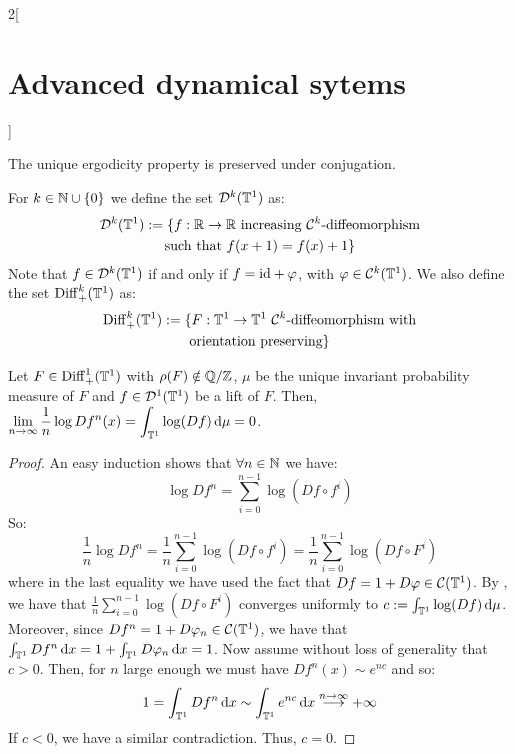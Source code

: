 \documentclass[../../../main_math.tex]{subfiles}
\begin{document}
\begin{multicols}{2}[\section{Advanced dynamical sytems}]
  \begin{remark}
    The unique ergodicity property is preserved under conjugation.
  \end{remark}
  \begin{definition}
    For $k\in\mathbb{N}\cup\{0\}$ we define the set $\mathcal{D}^k(\mathbb{T}^1)$ as:
    \begin{multline*}
      \mathcal{D}^k(\mathbb{T}^1):=\{f:\mathbb{R}\to\mathbb{R} \text{ increasing $\mathcal{C}^k$-diffeomorphism}\\\text{such that }f(x+1)=f(x)+1\}
    \end{multline*}
    Note that $f\in \mathcal{D}^k(\mathbb{T}^1)$ if and only if $f=\mathrm{id} +\varphi$, with $\varphi\in\mathcal{C}^k(\mathbb{T}^1)$.
    We also define the set $\mathrm{Diff}_+^k(\mathbb{T}^1)$ as:
    \begin{multline*}
      \mathrm{Diff}_+^k(\mathbb{T}^1):=\{F:\mathbb{T}^1\to\mathbb{T}^1 \text{ $\mathcal{C}^k$-diffeomorphism with}\\\text{orientation preserving}\}
    \end{multline*}
  \end{definition}
  \begin{proposition}
    Let $F\in\mathrm{Diff}_+^1(\mathbb{T}^1)$ with $\rho(F)\notin\quot{\QQ}{\ZZ}$, $\mu$ be the unique invariant probability measure of $F$ and $f\in\mathcal{D}^1(\mathbb{T}^1)$ be a lift of $F$. Then, $\displaystyle \lim_{n\to \infty}\frac{1}{n}\log Df^n(x)=\int_{\mathbb{T}^1}\log(Df)\dd{\mu}=0$.
  \end{proposition}
  \begin{proof}
    An easy induction shows that $\forall n\in\mathbb{N}$ we have:
    $$
      \log Df^n=\sum_{i=0}^{n-1}\log(Df\circ f^i)
    $$
    So:
    $$
      \frac{1}{n}\log Df^n=\frac{1}{n}\sum_{i=0}^{n-1}\log(Df\circ f^i)=\frac{1}{n}\sum_{i=0}^{n-1}\log(Df\circ F^i)
    $$
    where in the last equality we have used the fact that $Df=1+D\varphi\in \mathcal{C}(\mathbb{T}^1)$. By , we have that $\frac{1}{n}\sum_{i=0}^{n-1}\log(Df\circ F^i)$ converges uniformly to $c:=\int_{\mathbb{T}^1}\log(Df)\dd{\mu}$. Moreover, since $Df^n=1+D\varphi_n\in \mathcal{C}(\mathbb{T}^1)$, we have that $\int_{\mathbb{T}^1}Df^n\dd{x} =1+\int_{\mathbb{T}^1}D\varphi_n\dd{x}=1$. Now assume without loss of generality that $c>0$. Then, for $n$ large enough we must have $Df^n(x)\sim e^{nc}$ and so:
    $$
      1=\int_{\mathbb{T}^1}Df^n\dd{x}\sim \int_{\mathbb{T}^1}e^{nc}\dd{x}\overset{n\to\infty}{\longrightarrow} +\infty
    $$
    If $c<0$, we have a similar contradiction. Thus, $c=0$.
  \end{proof}
  \begin{definition}

\end{definition}
\end{multicols}
\end{document}
